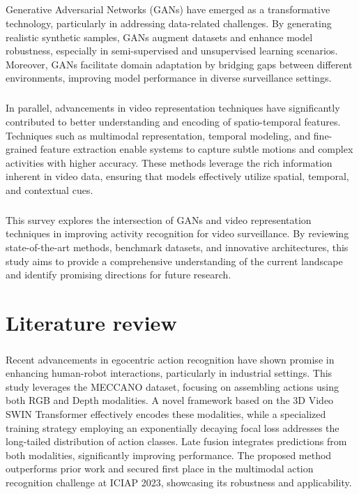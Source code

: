 \documentclass[11pt,a4paper]{report}
\begin{document}
\paragraph{ } Generative Adversarial Networks (GANs) have emerged as a transformative technology, particularly in addressing data-related challenges. By generating realistic synthetic samples, GANs augment datasets and enhance model robustness, especially in semi-supervised and unsupervised learning scenarios. Moreover, GANs facilitate domain adaptation by bridging gaps between different environments, improving model performance in diverse surveillance settings.

\paragraph{ } In parallel, advancements in video representation techniques have significantly contributed to better understanding and encoding of spatio-temporal features. Techniques such as multimodal representation, temporal modeling, and fine-grained feature extraction enable systems to capture subtle motions and complex activities with higher accuracy. These methods leverage the rich information inherent in video data, ensuring that models effectively utilize spatial, temporal, and contextual cues.

\paragraph{ }This survey explores the intersection of GANs and video representation techniques in improving activity recognition for video surveillance. By reviewing state-of-the-art methods, benchmark datasets, and innovative architectures, this study aims to provide a comprehensive understanding of the current landscape and identify promising directions for future research.


\chapter{Literature review}

\paragraph{} Recent advancements in egocentric action recognition \cite{kini2023egocentric} have shown promise in enhancing human-robot interactions, particularly in industrial settings. This study leverages the MECCANO dataset, focusing on assembling actions using both RGB and Depth modalities. A novel framework based on the 3D Video SWIN Transformer effectively encodes these modalities, while a specialized training strategy employing an exponentially decaying focal loss addresses the long-tailed distribution of action classes. Late fusion integrates predictions from both modalities, significantly improving performance. The proposed method outperforms prior work and secured first place in the multimodal action recognition challenge at ICIAP 2023, showcasing its robustness and applicability.
\end{document}
